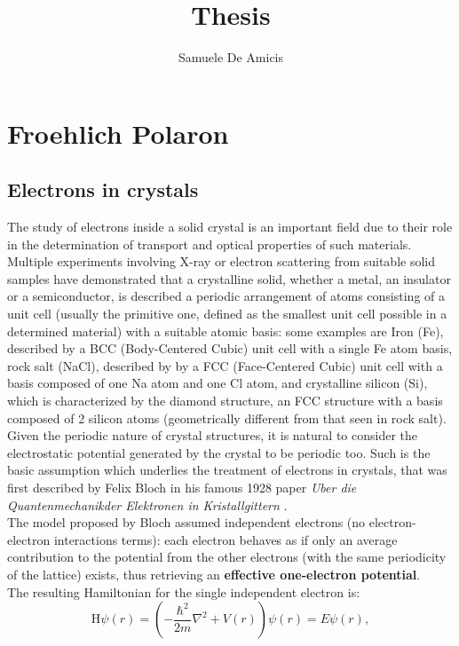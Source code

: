 \documentclass[12pt, a4paper]{report}
\title{Thesis}
\author{Samuele De Amicis}
\numberwithin{equation}{section}
\begin{document}
\maketitle

\chapter{Froehlich Polaron}
\section{Electrons in crystals}
The study of electrons inside a solid crystal is an important field due to their role in the determination of transport
and optical properties of such materials.\\
Multiple experiments involving X-ray or electron scattering from suitable solid samples have demonstrated that a crystalline solid, 
whether a metal, an insulator or a semiconductor, is described a periodic arrangement of atoms consisting of a unit cell 
(usually the primitive one, defined as the smallest unit cell possible in a determined material) with a suitable 
atomic basis: some examples are Iron (Fe), described by a BCC (Body-Centered Cubic) unit cell with a single Fe atom basis, 
rock salt (NaCl), described by by a FCC (Face-Centered Cubic) unit cell with a basis composed of one Na atom and one Cl atom, and 
crystalline silicon (Si), which is characterized by the diamond structure, an FCC structure with a basis composed of 2 silicon atoms 
(geometrically different from that seen in rock salt). \\
Given the periodic nature of crystal structures, it is natural to consider the electrostatic potential generated by the crystal to 
be periodic too. Such is the basic assumption which underlies the treatment of electrons in crystals, that was first described by 
Felix Bloch in his famous 1928 paper \textit{Uber die Quantenmechanikder Elektronen in Kristallgittern} \cite{bloch1928quantum}.\\
The model proposed by Bloch assumed independent electrons (no electron-electron interactions terms): each electron behaves as 
if only an average contribution to the potential from the other electrons (with the same periodicity of the lattice) exists, thus 
retrieving an \textbf{effective one-electron potential}.\\
The resulting Hamiltonian for the single independent electron is:
\begin{equation}
    \mathrm{H}\psi(r)=\left(-\frac{\hbar^2}{2m}\nabla^2+V(r)\right)\psi(r)=E\psi(r),
    \label{eq_0_00}
\end{equation}
\end{document}
